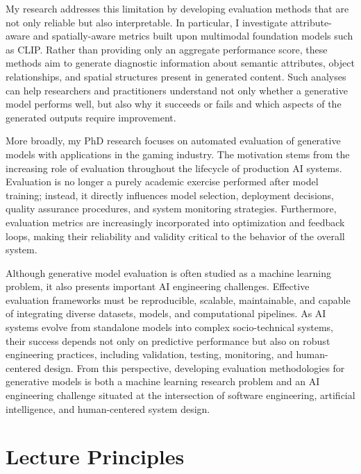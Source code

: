 \documentclass{article}
\begin{document}
My research addresses this limitation by developing evaluation methods that are not only reliable but also interpretable. In particular, I investigate attribute-aware and spatially-aware metrics built upon multimodal foundation models such as CLIP\cite{radford2021learning}. Rather than providing only an aggregate performance score, these methods aim to generate diagnostic information about semantic attributes, object relationships, and spatial structures present in generated content. Such analyses can help researchers and practitioners understand not only whether a generative model performs well, but also why it succeeds or fails and which aspects of the generated outputs require improvement.

More broadly, my PhD research focuses on automated evaluation of generative models with applications in the gaming industry. The motivation stems from the increasing role of evaluation throughout the lifecycle of production AI systems. Evaluation is no longer a purely academic exercise performed after model training; instead, it directly influences model selection, deployment decisions, quality assurance procedures, and system monitoring strategies. Furthermore, evaluation metrics are increasingly incorporated into optimization and feedback loops, making their reliability and validity critical to the behavior of the overall system.

Although generative model evaluation is often studied as a machine learning problem, it also presents important AI engineering challenges. Effective evaluation frameworks must be reproducible, scalable, maintainable, and capable of integrating diverse datasets, models, and computational pipelines. As AI systems evolve from standalone models into complex socio-technical systems, their success depends not only on predictive performance but also on robust engineering practices, including validation, testing, monitoring, and human-centered design. From this perspective, developing evaluation methodologies for generative models is both a machine learning research problem and an AI engineering challenge situated at the intersection of software engineering, artificial intelligence, and human-centered system design.







\section{Lecture Principles}
\end{document}
